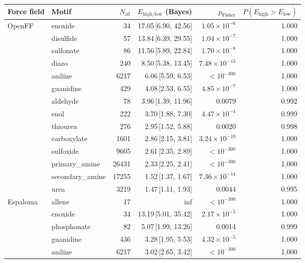 \begin{table}[t]
  \centering
  \small
  \setlength{\tabcolsep}{6pt}
  \renewcommand{\arraystretch}{1.15}
  \begin{tabular}{llrrrr}
    \hline
    Force field & Motif & $N_\mathrm{all}$ & $E_{\mathrm{high/low}}$ (Bayes) & $p_\mathrm{Fisher}$ & $P(E_{\mathrm{high}}>E_{\mathrm{low}})$ \\
    \hline
    OpenFF & enoxide & 34 & 17.05\,[6.90, 42.56] & $1.05\times 10^{-6}$ & 1.000 \\
      & disulfide & 57 & 13.84\,[6.39, 29.55] & $1.04\times 10^{-7}$ & 1.000 \\
      & sulfonate & 86 & 11.56\,[5.89, 22.84] & $1.70\times 10^{-8}$ & 1.000 \\
      & diazo & 240 & 8.50\,[5.38, 13.45] & $7.48\times 10^{-13}$ & 1.000 \\
      & aniline & 6217 & 6.06\,[5.59, 6.53] & $< 10^{-300}$ & 1.000 \\
      & guanidine & 429 & 4.08\,[2.53, 6.55] & $4.85\times 10^{-7}$ & 1.000 \\
      & aldehyde & 78 & 3.96\,[1.39, 11.96] & 0.0079 & 0.992 \\
      & enol & 222 & 3.70\,[1.88, 7.30] & $4.47\times 10^{-4}$ & 0.999 \\
      & thiourea & 276 & 2.95\,[1.52, 5.88] & 0.0020 & 0.998 \\
      & carboxylate & 1601 & 2.86\,[2.15, 3.81] & $3.24\times 10^{-10}$ & 1.000 \\
      & sulfoxide & 9605 & 2.61\,[2.35, 2.89] & $< 10^{-300}$ & 1.000 \\
      & primary\_amine & 26431 & 2.33\,[2.25, 2.41] & $< 10^{-300}$ & 1.000 \\
      & secondary\_amine & 17255 & 1.52\,[1.37, 1.67] & $7.36\times 10^{-14}$ & 1.000 \\
      & urea & 3219 & 1.47\,[1.11, 1.93] & 0.0044 & 0.995 \\
    \hline
    Espaloma & allene & 17 & inf & $< 10^{-300}$ & 1.000 \\
      & enoxide & 34 & 13.19\,[5.01, 35.42] & $2.17\times 10^{-5}$ & 1.000 \\
      & phosphonate & 82 & 5.07\,[1.99, 13.26] & 0.0014 & 0.999 \\
      & guanidine & 436 & 3.28\,[1.95, 5.53] & $4.32\times 10^{-5}$ & 1.000 \\
      & aniline & 6217 & 3.02\,[2.65, 3.42] & $< 10^{-300}$ & 1.000 \\

\end{tabular}
\end{table}
